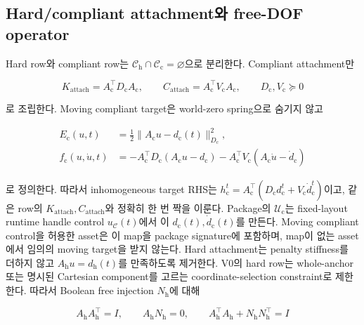 \documentclass[11pt,a4paper]{article}
\begin{document}
\subsection{Hard/compliant attachment와 free-DOF operator}

Hard row와 compliant row는
\(\mathcal C_{\mathrm h}\cap\mathcal C_{\mathrm c}=\varnothing\)으로 분리한다.
Compliant attachment만

\begin{equation}
  K_{\mathrm{attach}}
  =A_{\mathrm c}^\top D_{\mathrm c}A_{\mathrm c},
  \qquad
  C_{\mathrm{attach}}
  =A_{\mathrm c}^\top V_{\mathrm c}A_{\mathrm c},
  \qquad
  D_{\mathrm c},V_{\mathrm c}\succeq0
\end{equation}

로 조립한다. Moving compliant target은 world-zero spring으로 숨기지 않고

\begin{equation}
\begin{aligned}
  E_{\mathrm c}(u,t)
  &=\frac12\|A_{\mathrm c}u-d_{\mathrm c}(t)\|_{D_{\mathrm c}}^2,\\
  f_{\mathrm c}(u,\dot u,t)
  &=-A_{\mathrm c}^\top D_{\mathrm c}
    (A_{\mathrm c}u-d_{\mathrm c})
    -A_{\mathrm c}^\top V_{\mathrm c}
    (A_{\mathrm c}\dot u-\dot d_{\mathrm c})
\end{aligned}
\end{equation}

로 정의한다. 따라서 inhomogeneous target RHS는
\(h_{\mathrm c}^t=A_{\mathrm c}^\top
(D_{\mathrm c}d_{\mathrm c}^t+V_{\mathrm c}\dot d_{\mathrm c}^t)\)이고,
같은 row의 \(K_{\mathrm{attach}},C_{\mathrm{attach}}\)와 정확히 한 번 짝을 이룬다.
Package의 \(\mathcal U_{\mathrm c}\)는 fixed-layout runtime handle control
\(u_{\mathcal C}(t)\)에서 이 \(d_{\mathrm c}(t),\dot d_{\mathrm c}(t)\)를 만든다.
Moving compliant control을 허용한 asset은 이 map을 package signature에 포함하며,
map이 없는 asset에서 임의의 moving target을 받지 않는다.
Hard attachment는 penalty stiffness를 더하지 않고
\(A_{\mathrm h}u=d_{\mathrm h}(t)\)를 만족하도록 제거한다.
V0의 hard row는 whole-anchor 또는 명시된 Cartesian component를 고르는
coordinate-selection constraint로 제한한다. 따라서 Boolean free injection \(N_{\mathrm h}\)에 대해

\begin{equation}
  A_{\mathrm h}A_{\mathrm h}^\top=I,\qquad
  A_{\mathrm h}N_{\mathrm h}=0,\qquad
  A_{\mathrm h}^\top A_{\mathrm h}
  +N_{\mathrm h}N_{\mathrm h}^\top=I
\end{equation}
\end{document}
